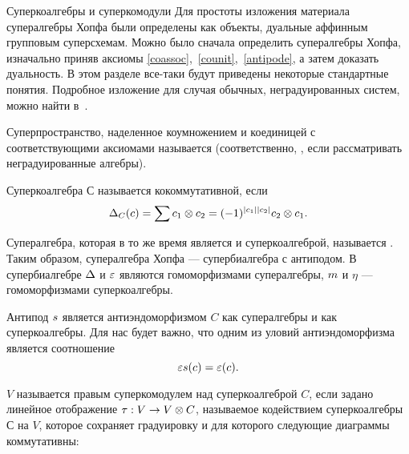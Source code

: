 \begin{subsection}{Суперкоалгебры и суперкомодули}
  Для простоты изложения материала супералгебры Хопфа были определены как
  объекты, дуальные аффинным групповым суперсхемам. Можно было сначала
  определить супералгебры Хопфа, изначально приняв аксиомы
  \ref{coassoc},~\ref{counit},~\ref{antipode}, а затем доказать дуальность.
  В этом разделе все-таки будут приведены некоторые стандартные понятия.
  Подробное изложение для случая обычных, неградуированных систем,
  можно найти в~\cite{sweedler}.

  Суперпространство, наделенное коумножением и коединицей с соответствующими
  аксиомами называется  (соответственно, ,
  если рассматривать неградуированные алгебры).
  \begin{definition}
    Суперкоалгебра $ С $ называется кокоммутативной, если
    $$ \mcm_C (c) = \sum c_1 \o c_2 = \sgn{c_1}{c_2} c_2 \o c_1. $$
  \end{definition}

  Супералгебра, которая в то же время
  является и суперкоалгеброй, называется . Таким образом,
  супералгебра Хопфа --- супербиалгебра с антиподом. В супербиалгебре
  $ \Delta $ и $ \varepsilon $ являются гомоморфизмами супералгебры, $ m $ и $ \eta $ ---
  гомоморфизмами суперкоалгебры.

  Антипод $ s $ является антиэндоморфизмом $ C $ как супералгебры и как
  суперкоалгебры. Для нас будет важно, что одним из уловий антиэндоморфизма
  является соотношение
  \begin{equation}\label{antiendomorphism}
    \varepsilon s(c) = \varepsilon(c).
  \end{equation}

  \begin{definition}
    $ V $ называется правым суперкомодулем над суперкоалгеброй $ C $, если задано
    линейное отображение $ \tau: V \to V \otimes C $, называемое кодействием
    суперкоалгебры $ С $ на $ V $, которое сохраняет градуировку и
    для которого следующие диаграммы коммутативны:


\end{definition}
\end{subsection}
